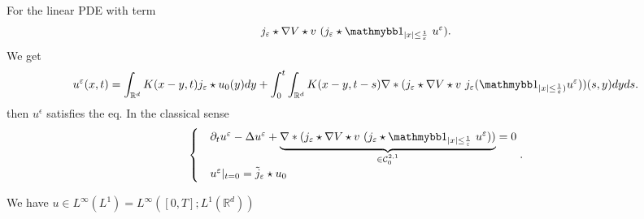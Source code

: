 \begin{remark}
 For the linear PDE with  term  
 \begin{align*}
  j_{\epsilon}\star \nabla V \star  v \ (j_{\epsilon} \star \cha_{\abs{x}\le \frac{1}{\epsilon}} \ u^{\epsilon} )
 .\end{align*}
 We get 
 \begin{align*}
   u^{\epsilon}(x,t) = \int_{\mathbb{R}^{d} } K(x-y,t)j_{\epsilon} \star u_{0}(y) dy + \int_0^{t}  \int_{\mathbb{R}^{d} } K(x-y,t-s) \nabla*(j_{\epsilon} \star \nabla V \star  v \ j_{\epsilon} (\cha_{\abs{x} \le  \frac{1}{\epsilon})} u^{\epsilon} ))(s,y) dy ds
 .\end{align*}
 then $u^{\epsilon} $ satisfies the eq. In the classical sense 
 \begin{align*}
  \begin{cases}
    &\partial_t u^{\epsilon}  - \Delta u^{\epsilon}  + \underbrace{\nabla*(j_{\epsilon}\star \nabla V \star  v \ (j_{\epsilon} \star \cha_{\abs{x}\le \frac{1}{\epsilon}} \ u^{\epsilon} ))}_{\in \mathcal{C}_0^{2,1} } = 0 \\ 
    &u^{\epsilon}  \rvert_{t=0} = \tilde{j}_{\epsilon} \star  u_{0}
  \end{cases}
 .\end{align*}
\end{remark}
\begin{lemma}[Estimates]
   We have $u \in  L^{\infty}(L^{1} ) =  L^{\infty}([0,T];L^{1}(\mathbb{R}^{d} ) ) $ 
\end{lemma}
